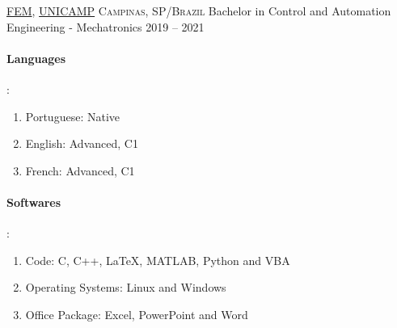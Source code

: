 \documentclass[10pt, a4paper]{article}
\begin{document}
\headedsection
    {\href{https://www.fem.unicamp.br/index.php/pt-br/}{FEM}, \href{https://www.unicamp.br/unicamp/universidade}{UNICAMP}}
    {\textsc{Campinas, SP/Brazil}}
    {
    \headedsubsection
        {Bachelor in Control and Automation Engineering - Mechatronics}
        {2019 -- 2021}
        {\bodytext{}}
    }

\spacedhrule{0.5em}{-0.4em}



\begin{multicols}{2}
    \paragraph{Languages}:
    \begin{enumerate}
        \item Portuguese: Native
        \item English: Advanced, C1
        \item French: Advanced, C1
    \end{enumerate}
    \columnbreak
    \paragraph{Softwares}:
    \begin{enumerate}
        \item Code: C, C++, LaTeX, MATLAB, Python and VBA
        \item Operating Systems: Linux and Windows
        \item Office Package: Excel, PowerPoint and Word
    \end{enumerate}
\end{multicols}
\end{document}
